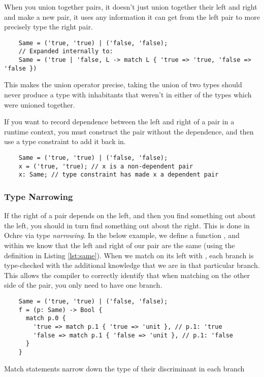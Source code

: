 \documentclass[12pt,twoside]{report}
\begin{document}
When you union together pairs, it doesn't just union together their left and right and make a new pair, it uses any information it can get from the left pair to more precisely type the right pair.

\begin{listing}[H]
  \begin{verbatim}
    Same = ('true, 'true) | ('false, 'false);
    // Expanded internally to:
    Same = ('true | 'false, L -> match L { 'true => 'true, 'false => 'false })
  \end{verbatim}
  \vspace{-0.5em}
  \caption{}
  \label{lst:same}
\end{listing}
\vspace{-1em}

This makes the union operator precise, taking the union of two types should never produce a type with inhabitants that weren't in either of the types which were unioned together.

If you want to record dependence between the left and right of a pair in a runtime context, you must construct the pair without the dependence, and then use a type constraint to add it back in.

\begin{listing}[H]
  \begin{verbatim}
    Same = ('true, 'true) | ('false, 'false);
    x = ('true, 'true); // x is a non-dependent pair
    x: Same; // type constraint has made x a dependent pair
  \end{verbatim}
\end{listing}

\subsubsection{Type Narrowing}
If the right of a pair depends on the left, and then you find something out about the left, you should in turn find something out about the right. This is done in Ochre via type \textit{narrowing}. In the below example, we define a function , and within  we know that the left and right of our pair  are the same (using the definition in Listing \ref{lst:same}). When we match on its left with , each branch is type-checked with the additional knowledge that we are in that particular branch. This allows the compiler to correctly identify that when matching on the other side of the pair, you only need to have one branch.

\begin{listing}[H]
  \begin{verbatim}
    Same = ('true, 'true) | ('false, 'false);
    f = (p: Same) -> Bool {
      match p.0 {
        'true => match p.1 { 'true => 'unit }, // p.1: 'true
        'false => match p.1 { 'false => 'unit }, // p.1: 'false
      }
    }
  \end{verbatim}
  \caption{Match statements narrow down the type of their discriminant in each branch}
\end{listing}
\end{document}
